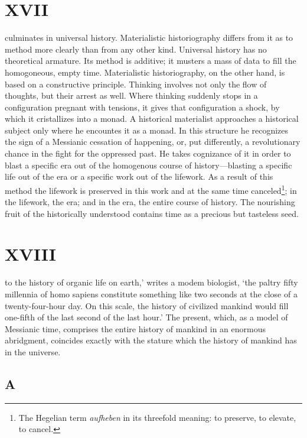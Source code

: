\documentclass[12pt]{tufte-handout}
\begin{document}
\section{XVII}	 
 	 	 
 culminates in universal history. Materialistic historiography differs from it as to method more clearly than from any other kind. Universal history has no theoretical armature. Its method is additive; it musters a mass of data to fill the homogoneous, empty time. Materialistic historiography, on the other hand, is based on a constructive principle. Thinking involves not only the flow of thoughts, but their arrest as well. Where thinking suddenly stops in a configuration pregnant with tensions, it gives that configuration a shock, by which it cristallizes into a monad. A historical materialist approaches a historical subject only where he encountes it as a monad. In this structure he recognizes the sign of a Messianic cessation of happening, or, put differently, a revolutionary chance in the fight for the oppressed past. He takes cognizance of it in order to blast a specific era out of the homogenous course of history—blasting a specific life out of the era or a specific work out of the lifework. As a result of this method the lifework is preserved in this work and at the same time canceled\footnote{The Hegelian term \textit{aufheben} in its threefold meaning: to preserve, to elevate, to cancel.}; in the lifework, the era; and in the era, the entire course of history. The nourishing fruit of the historically understood contains time as a precious but tasteless seed. 	 
 	 	  
\section{XVIII}	 
 	 	 
 to the history of organic life on earth,' writes a modem biologist, `the paltry fifty millennia of homo sapiens constitute something like two seconds at the close of a twenty-four-hour day. On this scale, the history of civilized mankind would fill one-fifth of the last second of the last hour.' The present, which, as a model of Messianic time, comprises the entire history of mankind in an enormous abridgment, coincides exactly with the stature which the history of mankind has in the universe.	 
 	 	 
 	 	 
\subsection{A}	 
 	 	 
\end{document}
